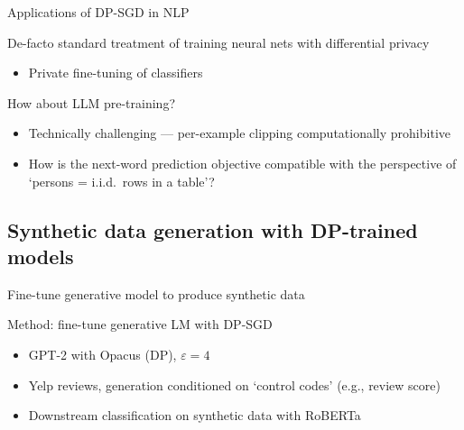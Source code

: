 \documentclass[12pt,aspectratio=169,handout]{beamer}
\begin{document}
\begin{frame}{Applications of DP-SGD in NLP}

De-facto standard treatment of training neural nets with differential privacy

\begin{itemize}
	\item Private fine-tuning of classifiers
\end{itemize}

How about LLM pre-training?

\begin{itemize}
	\item Technically challenging --- per-example clipping computationally prohibitive
	\item How is the next-word prediction objective compatible with the perspective of `persons = i.i.d.\ rows in a table'?
\end{itemize}

\end{frame}

\subsection{Synthetic data generation with DP-trained models}

\begin{frame}{Fine-tune generative model to produce synthetic data}

Method: fine-tune generative LM with DP-SGD

\begin{itemize}
	\item GPT-2 with Opacus (DP), $\varepsilon = 4$
	\item Yelp reviews, generation conditioned on `control codes' (e.g., review score)
	\item Downstream classification on synthetic data with RoBERTa
\end{itemize}


\end{frame}
\end{document}
